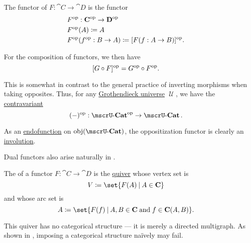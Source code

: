 \begin{definition}\label{def:opposite_functor}
  The  functor of \( F: \cat{C} \to \cat{D} \) is the functor
  \begin{equation*}
    \begin{aligned}
      &F^{\operatorname{op}}: \operatorname{\mathbf{C}}^{\operatorname{op}} \to \operatorname{\mathbf{D}}^{\operatorname{op}} \\
      &F^{\operatorname{op}}(A) \coloneqq A \\
      &F^{\operatorname{op}}(f^{\operatorname{op}}: B \to A) \coloneqq [F(f: A \to B)]^{\operatorname{op}}.
    \end{aligned}
  \end{equation*}

  For the composition of functors, we then have
  \begin{equation}\label{eq:def:opposite_functor/composition}
    [G \bincirc F]^{\opcat} = G^{\opcat} \bincirc F^{\opcat}.
  \end{equation}

  This is somewhat in contrast to the general practice of inverting morphisms when taking opposites. Thus, for any \hyperref[def:grothendieck_universe]{Grothendieck universe} \( \mscrU \), we have the \hyperref[rem:contravariant_functor]{contravariant} 
  \begin{equation*}
    (\anon*)^{\opcat}: \ucat{Cat}^{\opcat} \to \ucat{Cat}.
  \end{equation*}

  As an \hyperref[def:multi_valued_function/endofunction]{endofunction} on \( \obj(\ucat{Cat}) \), the oppositization functor is clearly an \hyperref[def:set_with_involution]{involution}.

  Dual functors also arise naturally in .
\end{definition}

\begin{definition}\label{def:functor_image}
  The  of a functor \( F: \cat{C} \to \cat{D} \) is the \hyperref[def:quiver]{quiver} whose vertex set is
  \begin{equation*}
    V \coloneqq \set{ F(A) \given A \in \cat{C} }
  \end{equation*}
  and whose arc set is
  \begin{equation*}
    A \coloneqq \set{ F(f) \given A, B \in \cat{C} \T{and} f \in \cat{C}(A, B) }.
  \end{equation*}

  This quiver has no categorical structure --- it is merely a directed multigraph. As shown in , imposing a categorical structure na\"ively may fail.
\end{definition}

